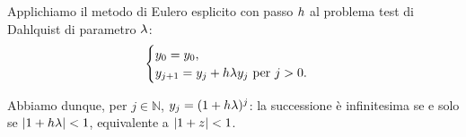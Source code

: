 \Proof Applichiamo il metodo di Eulero esplicito con passo $h$ al problema test di Dahlquist di parametro $\lambda$: 
\[
\begin{cases}
	y_0 = y_0,\\
	y_{j + 1} = y_j + h \lambda y_j\text{ per }j > 0.
\end{cases}
\]
\par Abbiamo dunque, per $j \in \mathbb{N}$, $y_j = (1 + h \lambda)^j$: la successione \`e infinitesima se e solo se $\left \lvert 1 + h \lambda \right \rvert < 1$, equivalente a $\left \lvert 1 + z \right \rvert < 1$. \EndProof

